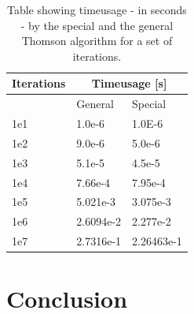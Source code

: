 \documentclass[twoside,twocolumn]{article}
\begin{document}
\begin{table}[htp]
\centering
\begin{tabular}{|l|l|l|} \hline
Iterations & \multicolumn{2}{|c|}{Timeusage [s]}\\ \hline
 	& General 	& Special\\ \hline
1e1	& 1.0e-6	& 1.0E-6\\
1e2 & 9.0e-6	& 5.0e-6\\
1e3 & 5.1e-5	& 4.5e-5\\
1e4 & 7.66e-4	& 7.95e-4\\
1e5 & 5.021e-3	& 3.075e-3\\
1e6 & 2.6094e-2	&2.277e-2\\
1e7 & 2.7316e-1	& 2.26463e-1 \\ \hline
\end{tabular}
\caption{Table showing timeusage - in seconds - by the special and the general Thomson algorithm for a set of iterations.} \label{tbl:ThompsonTime}
\end{table}

\newpage
\section{Conclusion}
\blindtext

\twocolumn[{%
{}

}]
\end{document}
